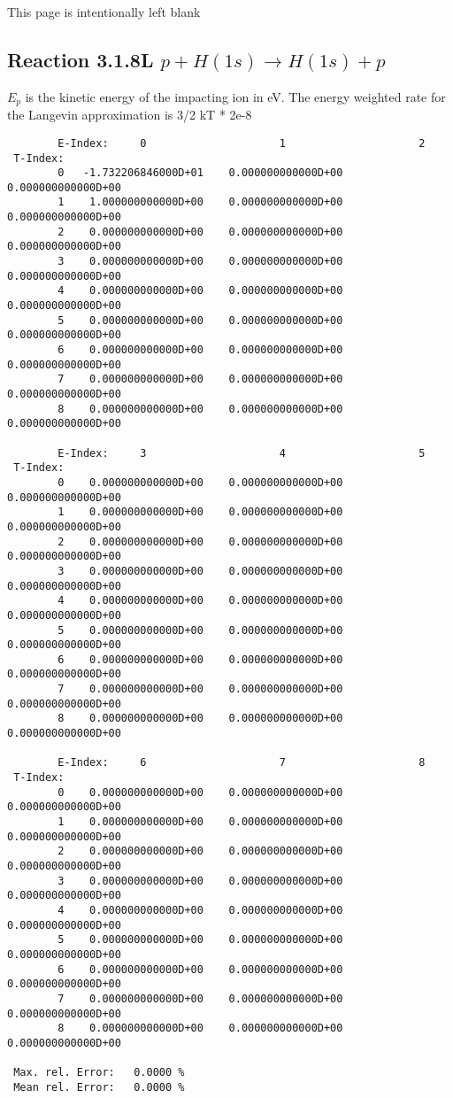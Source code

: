 \documentclass[12pt,dvipdfmx]{article}
\begin{document}
\newpage
This page is intentionally left blank
\newpage
\subsection{
Reaction 3.1.8L  $p + H(1s)  \rightarrow  H(1s) + p $
}
$E_p$ is the kinetic energy of the impacting ion in eV.
The energy weighted rate for the Langevin approximation is
3/2 kT * 2e-8

\begin{small}\begin{verbatim}
        E-Index:     0                     1                     2
 T-Index:
        0   -1.732206846000D+01    0.000000000000D+00    0.000000000000D+00
        1    1.000000000000D+00    0.000000000000D+00    0.000000000000D+00
        2    0.000000000000D+00    0.000000000000D+00    0.000000000000D+00
        3    0.000000000000D+00    0.000000000000D+00    0.000000000000D+00
        4    0.000000000000D+00    0.000000000000D+00    0.000000000000D+00
        5    0.000000000000D+00    0.000000000000D+00    0.000000000000D+00
        6    0.000000000000D+00    0.000000000000D+00    0.000000000000D+00
        7    0.000000000000D+00    0.000000000000D+00    0.000000000000D+00
        8    0.000000000000D+00    0.000000000000D+00    0.000000000000D+00

        E-Index:     3                     4                     5
 T-Index:
        0    0.000000000000D+00    0.000000000000D+00    0.000000000000D+00
        1    0.000000000000D+00    0.000000000000D+00    0.000000000000D+00
        2    0.000000000000D+00    0.000000000000D+00    0.000000000000D+00
        3    0.000000000000D+00    0.000000000000D+00    0.000000000000D+00
        4    0.000000000000D+00    0.000000000000D+00    0.000000000000D+00
        5    0.000000000000D+00    0.000000000000D+00    0.000000000000D+00
        6    0.000000000000D+00    0.000000000000D+00    0.000000000000D+00
        7    0.000000000000D+00    0.000000000000D+00    0.000000000000D+00
        8    0.000000000000D+00    0.000000000000D+00    0.000000000000D+00

        E-Index:     6                     7                     8
 T-Index:
        0    0.000000000000D+00    0.000000000000D+00    0.000000000000D+00
        1    0.000000000000D+00    0.000000000000D+00    0.000000000000D+00
        2    0.000000000000D+00    0.000000000000D+00    0.000000000000D+00
        3    0.000000000000D+00    0.000000000000D+00    0.000000000000D+00
        4    0.000000000000D+00    0.000000000000D+00    0.000000000000D+00
        5    0.000000000000D+00    0.000000000000D+00    0.000000000000D+00
        6    0.000000000000D+00    0.000000000000D+00    0.000000000000D+00
        7    0.000000000000D+00    0.000000000000D+00    0.000000000000D+00
        8    0.000000000000D+00    0.000000000000D+00    0.000000000000D+00

 Max. rel. Error:   0.0000 %
 Mean rel. Error:   0.0000 %
\end{verbatim}\end{small}
\end{document}
